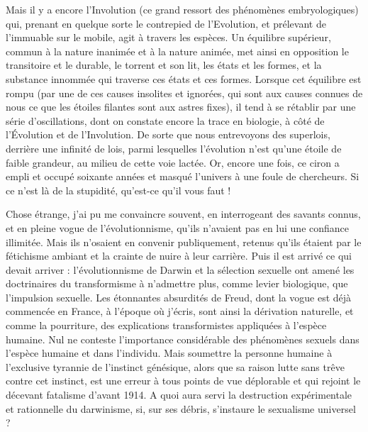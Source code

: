 \documentclass[french,twoside]{book} %
\begin{document}
Mais il y a encore l’Involution (ce grand ressort des phénomènes embryologiques) qui, prenant en quelque sorte le contrepied de l’Evolution, et prélevant de l’immuable sur le mobile, agit à travers les espèces. Un équilibre supérieur, commun à la nature inanimée et à la nature animée, met ainsi en opposition le transitoire et le durable, le torrent et son lit, les états et les formes, et la substance innommée qui traverse ces états et ces formes. Lorsque cet équilibre est rompu (par une de ces causes insolites et ignorées, qui sont aux causes connues de nous ce que les étoiles filantes sont aux astres fixes), il tend à se rétablir par une série d’oscillations, dont on constate encore la trace en biologie, à côté de l’Évolution et de l’Involution. De sorte que nous entrevoyons des superlois, derrière une infinité de lois, parmi lesquelles l’évolution n’est qu’une étoile de faible grandeur, au milieu de cette voie lactée. Or, encore une fois, ce ciron a empli et occupé soixante années et masqué l’univers à une foule de chercheurs. Si ce n’est là de la stupidité, qu’est-ce qu’il vous faut !\par
Chose étrange, j’ai pu me convaincre souvent, en interrogeant des savants connus, et en pleine vogue de l’évolutionnisme, qu’ils n’avaient pas en lui une confiance illimitée. Mais ils n’osaient en convenir publiquement, retenus qu’ils étaient par le fétichisme ambiant et la crainte de nuire à leur carrière. Puis il est arrivé ce qui devait arriver : l’évolutionnisme de Darwin et la sélection sexuelle ont amené les doctrinaires du transformisme à n’admettre plus, comme levier biologique, que l’impulsion sexuelle. Les étonnantes absurdités de Freud, dont la vogue est déjà commencée en France, à l’époque où j’écris, sont ainsi la dérivation naturelle, et comme la pourriture, des explications transformistes appliquées à l’espèce humaine. Nul ne conteste l’importance considérable des phénomènes sexuels dans l’espèce humaine et dans l’individu. Mais soumettre la personne humaine à l’exclusive tyrannie de l’instinct génésique, alors que sa raison lutte sans trêve contre cet instinct, est une erreur à tous points de vue déplorable et qui rejoint le décevant fatalisme d’avant 1914. A quoi aura servi la destruction expérimentale et rationnelle du darwinisme, si, sur ses débris, s’instaure le sexualisme universel ?\par
\end{document}
